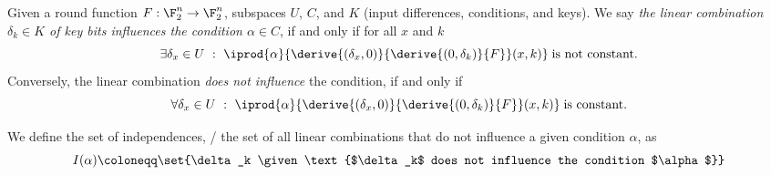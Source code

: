 \begin{definition}
    Given a round function $F : \F_2^n \to \F_2^n$, subspaces $U$, $C$, and $K$ (input differences, conditions, and keys).
    We say \emph{the linear combination $\delta_k \in K$ of key bits influences the condition $\alpha \in C$}, if and only if for all $x$ and $k$
    \begin{equation*}
        \exists \delta_x \in U\ :\ \iprod{\alpha}{\derive{(\delta_x, 0)}{\derive{(0, \delta_k)}{F}}(x, k)}\; \text{is not constant.}
    \end{equation*}
    Conversely, the linear combination \emph{does not influence} the condition, if and only if
    \begin{equation*}
        \forall \delta_x \in U\ :\ \iprod{\alpha}{\derive{(\delta_x, 0)}{\derive{(0, \delta_k)}{F}}(x, k)}\; \text{is constant.}
    \end{equation*}

    We define the set of independences, \ie/ the set of all linear combinations that do not influence a given condition $\alpha$, as
    \begin{equation*}
        I(\alpha) \coloneqq \set{\delta_k \given \text{$\delta_k$ does not influence the condition $\alpha$}}
    \end{equation*}
\end{definition}


